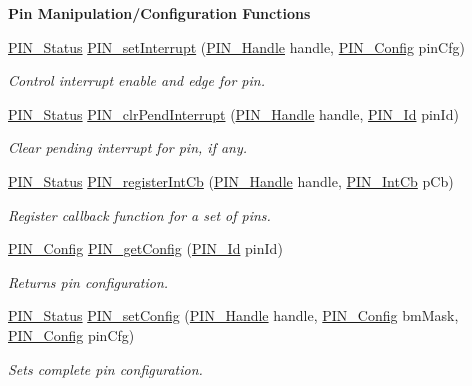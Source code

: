 \begin{Indent}{\bf Pin Manipulation/\-Configuration Functions}
\begin{DoxyCompactItemize}
\hyperlink{_p_i_n_8h_abe0ad59bbf09e51fe37195a5e70b23f6}{P\-I\-N\-\_\-\-Status} \hyperlink{_p_i_n_8h_a69e2aac02eaabf8d3c3a248a27dd7d0e}{P\-I\-N\-\_\-set\-Interrupt} (\hyperlink{_p_i_n_8h_afb2de52b054638f63c39df1f30a0d88d}{P\-I\-N\-\_\-\-Handle} handle, \hyperlink{_p_i_n_8h_ae427b7d2925f9b0f3145e455cfdb5841}{P\-I\-N\-\_\-\-Config} pin\-Cfg)
\begin{DoxyCompactList}\small\item\em Control interrupt enable and edge for pin. \end{DoxyCompactList}\item 
\hyperlink{_p_i_n_8h_abe0ad59bbf09e51fe37195a5e70b23f6}{P\-I\-N\-\_\-\-Status} \hyperlink{_p_i_n_8h_a82957789e7c370b6dd4f16fa36045522}{P\-I\-N\-\_\-clr\-Pend\-Interrupt} (\hyperlink{_p_i_n_8h_afb2de52b054638f63c39df1f30a0d88d}{P\-I\-N\-\_\-\-Handle} handle, \hyperlink{_p_i_n_8h_a9ae8197f460bb76ea09a84f47d09921f}{P\-I\-N\-\_\-\-Id} pin\-Id)
\begin{DoxyCompactList}\small\item\em Clear pending interrupt for pin, if any. \end{DoxyCompactList}\item 
\hyperlink{_p_i_n_8h_abe0ad59bbf09e51fe37195a5e70b23f6}{P\-I\-N\-\_\-\-Status} \hyperlink{_p_i_n_8h_ae906e3b4880c7c921c90d0baf0ce6e42}{P\-I\-N\-\_\-register\-Int\-Cb} (\hyperlink{_p_i_n_8h_afb2de52b054638f63c39df1f30a0d88d}{P\-I\-N\-\_\-\-Handle} handle, \hyperlink{_p_i_n_8h_a9194f02a570a8f5595a2acd2723b8fac}{P\-I\-N\-\_\-\-Int\-Cb} p\-Cb)
\begin{DoxyCompactList}\small\item\em Register callback function for a set of pins. \end{DoxyCompactList}\item 
\hyperlink{_p_i_n_8h_ae427b7d2925f9b0f3145e455cfdb5841}{P\-I\-N\-\_\-\-Config} \hyperlink{_p_i_n_8h_aed24cb96de8fa957e9f7c05dd239f2f9}{P\-I\-N\-\_\-get\-Config} (\hyperlink{_p_i_n_8h_a9ae8197f460bb76ea09a84f47d09921f}{P\-I\-N\-\_\-\-Id} pin\-Id)
\begin{DoxyCompactList}\small\item\em Returns pin configuration. \end{DoxyCompactList}\item 
\hyperlink{_p_i_n_8h_abe0ad59bbf09e51fe37195a5e70b23f6}{P\-I\-N\-\_\-\-Status} \hyperlink{_p_i_n_8h_a4b9fbd1a86e63d2f14f679b87f17c857}{P\-I\-N\-\_\-set\-Config} (\hyperlink{_p_i_n_8h_afb2de52b054638f63c39df1f30a0d88d}{P\-I\-N\-\_\-\-Handle} handle, \hyperlink{_p_i_n_8h_ae427b7d2925f9b0f3145e455cfdb5841}{P\-I\-N\-\_\-\-Config} bm\-Mask, \hyperlink{_p_i_n_8h_ae427b7d2925f9b0f3145e455cfdb5841}{P\-I\-N\-\_\-\-Config} pin\-Cfg)
\begin{DoxyCompactList}\small\item\em Sets complete pin configuration. \end{DoxyCompactList}\end{DoxyCompactItemize}
\end{Indent}

